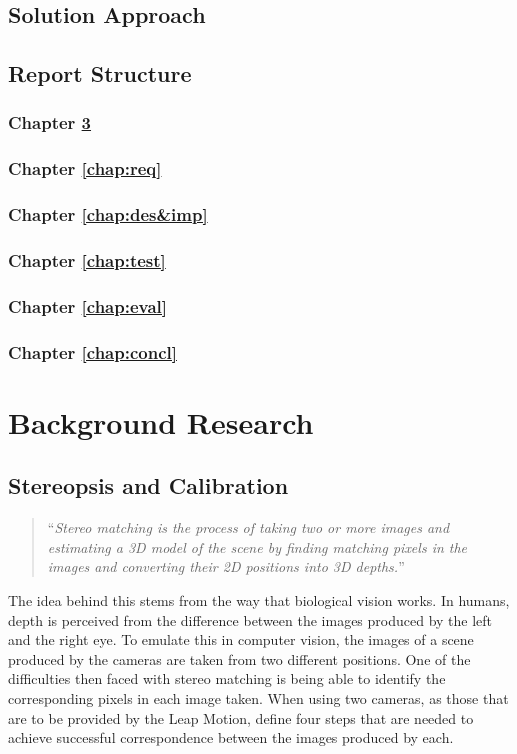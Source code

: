 \documentclass[11pt,oneside]{report}
\begin{document}
		\section{Solution Approach}
		\section{Report Structure}
			\subsection{Chapter \ref{chap:background}}
			\subsection{Chapter \ref{chap:req}}
			\subsection{Chapter \ref{chap:des&imp}}
			\subsection{Chapter \ref{chap:test}}
			\subsection{Chapter \ref{chap:eval}}
			\subsection{Chapter \ref{chap:concl}}
			
		
	\chapter{Background Research}\label{chap:background}
			\section{Stereopsis and Calibration}
			\begin{quote}
				``\textit{Stereo matching is the process of taking two or more images and estimating a 3D model of the scene by finding matching pixels in the images and converting their 2D positions into 3D depths.}''\cite{book:sam}
			\end{quote}
			The idea behind this stems from the way that biological vision works.
			In humans, depth is perceived from the difference between the images produced by the left and the right eye.
			To emulate this in computer vision, the images of a scene produced by the cameras are taken from two different positions.
			One of the difficulties then faced with stereo matching is being able to identify the corresponding pixels in each image taken.
			When using two cameras, as those that are to be provided by the Leap Motion,  define four steps that are needed to achieve successful correspondence between the images produced by each.
			
\end{document}

